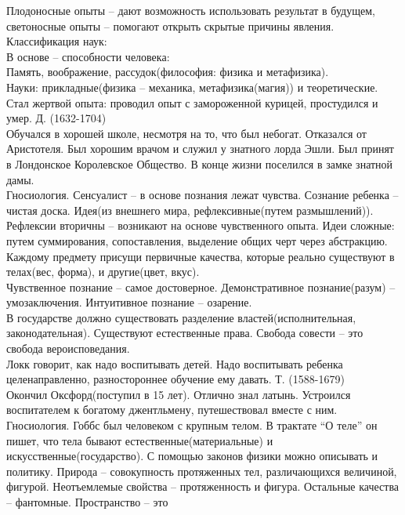 \documentclass[a4paper,12pt]{report} %
\begin{document}
\begin{itemize}
  Плодоносные опыты -- дают возможность использовать результат в будущем, светоносные опыты -- помогают открыть скрытые
  причины явления.\\
  Классификация наук:\\
  В основе -- способности человека:\\
  Память, воображение, рассудок(философия: физика и метафизика).\\
  Науки: прикладные(физика -- механика, метафизика(магия)) и
  теоретические.\\
  Стал жертвой опыта: проводил опыт с замороженной курицей, простудился
  и умер.
 Д. (1632-1704)\\
  Обучался в хорошей школе, несмотря на то, что был небогат. Отказался
  от Аристотеля. Был хорошим врачом и служил у знатного лорда Эшли. Был
  принят в Лондонское Королевское Общество. В конце жизни поселился в
  замке знатной дамы.\\
  Гносиология. Сенсуалист -- в основе познания лежат чувства. Сознание
  ребенка -- чистая доска. Идея(из внешнего мира, рефлексивные(путем
  размышлений)). Рефлексии вторичны -- возникают на основе чувственного
  опыта. Идеи сложные: путем суммирования, сопоставления, выделение
  общих черт через абстракцию. Каждому предмету присущи первичные
  качества, которые реально существуют в телах(вес, форма), и
  другие(цвет, вкус).\\
  Чувственное познание -- самое достоверное. Демонстративное
  познание(разум) -- умозаключения. Интуитивное познание -- озарение.\\
  В государстве должно существовать разделение властей(исполнительная,
  законодательная). Существуют естественные права. Свобода совести --
  это свобода вероисповедания.\\
  Локк говорит, как надо воспитывать детей. Надо воспитывать ребенка
  целенаправленно, разностороннее обучение ему давать.
 Т. (1588-1679)\\
  Окончил Оксфорд(поступил в 15 лет). Отлично знал латынь. Устроился
  воспитателем к богатому джентльмену, путешествовал вместе с ним.\\
  Гносиология. Гоббс был человеком с крупным телом. В трактате ``О
  теле'' он пишет, что тела бывают естественные(материальные) и
  искусственные(государство). С помощью законов физики можно описывать и
  политику. Природа -- совокупность протяженных тел, различающихся
  величиной, фигурой. Неотъемлемые свойства -- протяженность и
  фигура. Остальные качества -- фантомные. Пространство -- это

\end{itemize}
\end{document}
